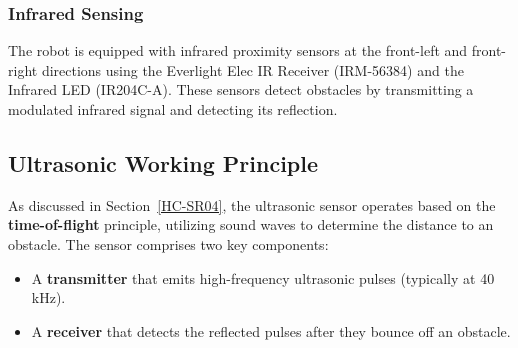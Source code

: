 \subsubsection{Infrared Sensing}  \label{IR_Intro}
The robot is equipped with infrared proximity sensors at the front-left and front-right directions using the Everlight Elec IR Receiver (IRM-56384) and the Infrared LED (IR204C-A). These sensors detect obstacles by transmitting a modulated infrared signal and detecting its reflection.
\begin{figure}[h]
	\centering
	\qquad
	\caption{}
	\label{fig:ir-sensors}
\end{figure}

\subsection{Ultrasonic Working Principle}
As discussed in Section~\ref{HC-SR04}, the ultrasonic sensor operates based on the \textbf{time-of-flight} principle, utilizing sound waves to determine the distance to an obstacle. The sensor comprises two key components:
\begin{itemize}
	\item A \textbf{transmitter} that emits high-frequency ultrasonic pulses (typically at 40 kHz).
	\item A \textbf{receiver} that detects the reflected pulses after they bounce off an obstacle.
\end{itemize}

